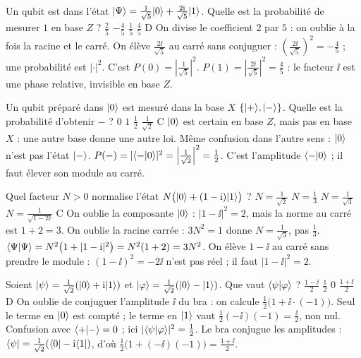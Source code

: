   {Un qubit est dans l'état $|\Psi\rangle=\frac{1}{\sqrt5}|0\rangle+\frac{2\mathrm{i}}{\sqrt5}|1\rangle$. Quelle est la probabilité de mesurer $1$ en base $Z$ ?}
  {$\frac25$}
  {$-\frac45$}
  {$\frac15$}
  {$\frac45$}
  {D}
\qcmx
  {On divise le coefficient $2$ par $5$ : on oublie à la fois la racine et le carré.}
  {On élève $\frac{2\ii}{\sqrt5}$ au carré sans conjuguer : $\left(\frac{2\ii}{\sqrt5}\right)^2=-\frac45$ ; une probabilité est $|\cdot|^2$.}
  {C'est $P(0)=\left|\frac{1}{\sqrt5}\right|^2$.}
  {$P(1)=\left|\frac{2\ii}{\sqrt5}\right|^2=\frac45$ : le facteur $\ii$ est une phase relative, invisible en base $Z$.}

  {Un qubit préparé dans $|0\rangle$ est mesuré dans la base $X$ $\{|+\rangle,|-\rangle\}$. Quelle est la probabilité d'obtenir $-$ ?}
  {$0$}
  {$1$}
  {$\frac12$}
  {$\frac{1}{\sqrt2}$}
  {C}
\qcmx
  {$|0\rangle$ est certain en base $Z$, mais pas en base $X$ : une autre base donne une autre loi.}
  {Même confusion dans l'autre sens : $|0\rangle$ n'est pas l'état $|-\rangle$.}
  {$P(-)=|\langle -|0\rangle|^2=\left|\frac{1}{\sqrt2}\right|^2=\frac12$.}
  {C'est l'amplitude $\langle -|0\rangle$ ; il faut élever son module au carré.}

  {Quel facteur $N>0$ normalise l'état $N\big(|0\rangle+(1-\mathrm{i})|1\rangle\big)$ ?}
  {$N=\frac{1}{\sqrt2}$}
  {$N=\frac13$}
  {$N=\frac{1}{\sqrt3}$}
  {$N=\frac{1}{\sqrt{1-2\ii}}$}
  {C}
\qcmx
  {On oublie la composante $|0\rangle$ : $|1-\ii|^2=2$, mais la norme au carré est $1+2=3$.}
  {On oublie la racine carrée : $3N^2=1$ donne $N=\frac{1}{\sqrt3}$, pas $\frac13$.}
  {$\langle \Psi|\Psi\rangle=N^2\big(1+|1-\mathrm{i}|^2\big)=N^2(1+2)=3N^2$.}
  {On élève $1-\ii$ au carré sans prendre le module : $(1-\ii)^2=-2\ii$ n'est pas réel ; il faut $|1-\ii|^2=2$.}

  {Soient $|\psi\rangle=\frac{1}{\sqrt2}(|0\rangle+\mathrm{i}|1\rangle)$ et $|\varphi\rangle=\frac{1}{\sqrt2}(|0\rangle-|1\rangle)$. Que vaut $\langle \psi|\varphi\rangle$ ?}
  {$\frac{1-\ii}{2}$}
  {$\frac12$}
  {$0$}
  {$\frac{1+\ii}{2}$}
  {D}
\qcmx
  {On oublie de conjuguer l'amplitude $\ii$ du bra : on calcule $\frac12\big(1+\ii\cdot(-1)\big)$.}
  {Seul le terme en $|0\rangle$ est compté ; le terme en $|1\rangle$ vaut $\frac12(-\ii)(-1)=\frac{\ii}{2}$, non nul.}
  {Confusion avec $\langle +|-\rangle=0$ ; ici $|\langle \psi|\varphi\rangle|^2=\frac12$.}
  {Le bra conjugue les amplitudes : $\langle \psi|=\frac{1}{\sqrt2}(\langle 0|-\mathrm{i}\langle 1|)$, d'où $\frac12\big(1+(-\ii)(-1)\big)=\frac{1+\ii}{2}$.}

